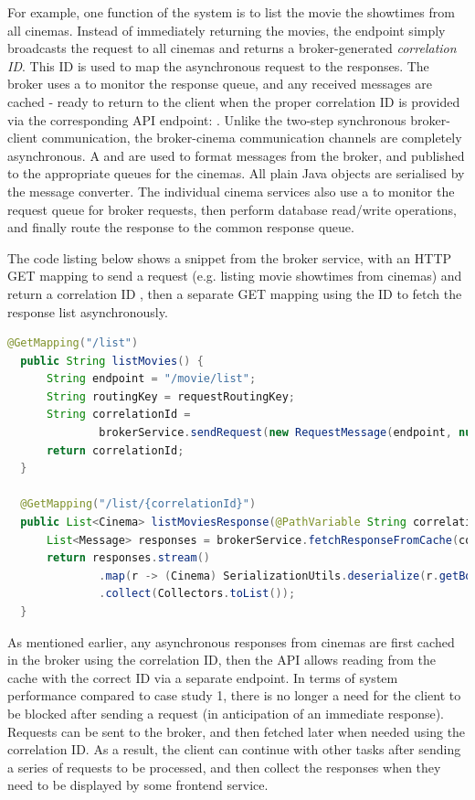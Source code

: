 For example, one function of the system is to list the movie the showtimes from all cinemas. Instead of immediately returning the movies, the  endpoint simply broadcasts the request to all cinemas and returns a broker-generated \textit{correlation ID}. This ID is used to map the asynchronous request to the responses. The broker uses a  to monitor the response queue, and any received messages are cached - ready to return to the client when the proper correlation ID is provided via the corresponding API endpoint: . Unlike the two-step synchronous broker-client communication, the broker-cinema communication channels are completely asynchronous. A  and  are used to format messages from the broker, and published to the appropriate queues for the cinemas. All plain Java objects are serialised by the message converter. The individual cinema services also use a  to monitor the request queue for broker requests, then perform database read/write operations, and finally route the response to the common response queue.

The code listing below shows a snippet from the broker service, with an HTTP GET mapping to send a request (e.g. listing movie showtimes from cinemas) and return a correlation ID , then a separate GET mapping using the ID to fetch the response list asynchronously.


\begin{lstlisting}[language=Java, caption=Code snippet from \code{MovieController.java} in \code{broker-service}.]
  @GetMapping("/list")
  public String listMovies() {
      String endpoint = "/movie/list";
      String routingKey = requestRoutingKey;
      String correlationId =
              brokerService.sendRequest(new RequestMessage(endpoint, null), routingKey);
      return correlationId;
  }

  @GetMapping("/list/{correlationId}")
  public List<Cinema> listMoviesResponse(@PathVariable String correlationId) {
      List<Message> responses = brokerService.fetchResponseFromCache(correlationId);
      return responses.stream()
              .map(r -> (Cinema) SerializationUtils.deserialize(r.getBody()))
              .collect(Collectors.toList());
  }
\end{lstlisting}

As mentioned earlier, any asynchronous responses from cinemas are first cached in the broker using the correlation ID, then the API allows reading from the cache with the correct ID via a separate endpoint. In terms of system performance compared to case study 1, there is no longer a need for the client to be blocked after sending a request (in anticipation of an immediate response). Requests can be sent to the broker, and then fetched later when needed using the correlation ID. As a result, the client can continue with other tasks after sending a series of requests to be processed, and then collect the responses when they need to be displayed by some frontend service.


